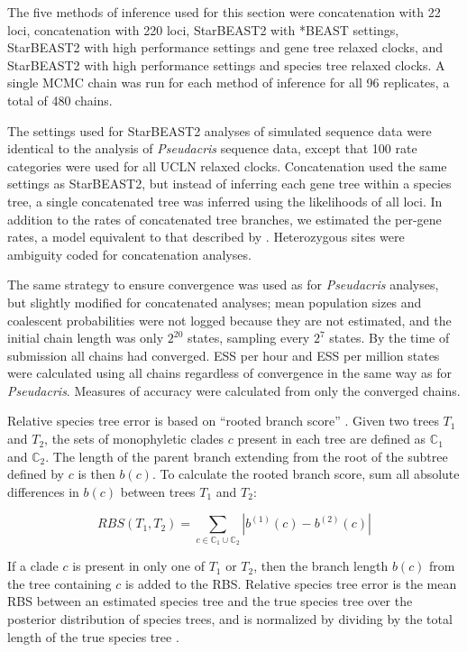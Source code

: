 \documentclass[nogrid]{MBE}%
\begin{document}
The five methods of inference used for this section were concatenation with 22
loci, concatenation with 220 loci, StarBEAST2 with *BEAST settings, StarBEAST2
with high performance settings and gene tree relaxed clocks, and StarBEAST2 with
high performance settings and species tree relaxed clocks. A single MCMC chain was
run for each method of inference for all 96 replicates, a total of 480 chains.

The settings used for StarBEAST2 analyses of simulated sequence data were
identical to the analysis of \textit{Pseudacris} sequence data, except that 100
rate categories were used for all UCLN relaxed clocks. Concatenation used the
same settings as StarBEAST2, but instead of inferring each gene tree within a
species tree, a single concatenated tree was inferred using the likelihoods of
all loci. In addition to the rates of concatenated tree branches, we estimated
the per-gene rates, a model equivalent to that described by \cite{Rasmussen01122007}.
Heterozygous sites were ambiguity coded for concatenation analyses.

The same strategy to ensure convergence was used as for \textit{Pseudacris}
analyses, but slightly modified for concatenated analyses; mean population sizes
and coalescent probabilities were not logged because they are not estimated, and
the initial chain length was only $2^{20}$ states, sampling every $2^{7}$
states. By the time of submission all chains had converged. ESS per hour and ESS
per million states were calculated using all chains regardless of convergence in
the same way as for \textit{Pseudacris}. Measures of accuracy were calculated
from only the converged chains.

Relative species tree error is based on ``rooted branch score''
\citep[RBS;][]{Heled2013}. Given two trees $T_1$ and $T_2$, the sets of
monophyletic clades $c$ present in each tree are defined as $\mathbb{C}_1$ and
$\mathbb{C}_2$. The length of the parent branch extending from the root of the
subtree defined by $c$ is then $b(c)$. To calculate the rooted branch score, sum
all absolute differences in $b(c)$ between trees $T_1$ and $T_2$:

\begin{equation}
RBS(T_1, T_2) = \sum_{c \in {\mathbb{C}_1} \cup {\mathbb{C}_2}} |b^{(1)}(c) - b^{(2)}(c)|
\end{equation}

If a clade $c$ is present in only one of $T_1$ or $T_2$, then the branch length
$b(c)$ from the tree containing $c$ is added to the RBS. Relative species tree
error is the mean RBS between an estimated species tree and the true
species tree over the posterior distribution of species trees, and is normalized
by dividing by the total length of the true species tree
\citep{Ogilvie01052016}.
\end{document}
